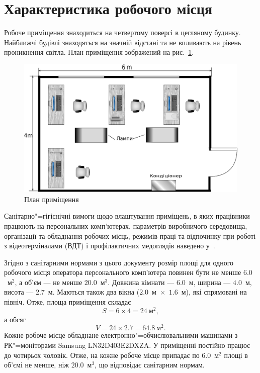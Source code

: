 \documentclass{diploma}
\begin{document}
  \section{Характеристика робочого місця}
    Робоче приміщення знаходиться на четвертому поверсі в цегляному будинку.
    Найближчі будівлі знаходяться на значній відстані та не впливають на
    рівень проникнення світла.
    План приміщення зображений на рис.~\ref{fig:plan}.
    \begin{figure}[ht]
      \centering
      \includegraphics[width=\linewidth]{plan2.eps}
      \caption{План приміщення}
      \label{fig:plan}
    \end{figure}

    Санітарно"=гігієнічні вимоги щодо влаштування приміщень, в яких працівники
    працюють на персональних комп’ютерах, параметрів виробничого середовища,
    організації та обладнання робочих місць, режимів праці та відпочинку при
    роботі з відеотерміналами (ВДТ) і профілактичних медоглядів наведено
    у~\cite{npaop128}.

    Згідно з санітарними нормами з цього документу розмір площі для одного
    робочого місця оператора персонального комп’ютера повинен бути не менше
    $6.0$~м$^2$, а об’єм --- не менше $20.0$~м$^3$.
    Довжина кімнати --- $6.0$~м, ширина --- $4.0$~м, висота ---
    $2.7$~м.
    Маються також два вікна ($2.0$~м~$\times$~$1.6$~м), які спрямовані
    на північ.
    Отже, площа приміщення складає
      \[
        S = 6 \times 4 = 24~\text{м}^2,
      \]
    а обсяг
      \[
        V = 24 \times 2.7 = 64.8~\text{м}^2.
      \]
    Кожне робоче місце обладнане електронно"=обчислювальними машинами з
    РК"=моніторами Samsung LN32D403E2DXZA.
    У приміщенні постійно працює до чотирьох чоловік.
    Отже, на кожне робоче місце припадає по $6.0$~м$^2$ площі в об’ємі не
    менше, ніж $20.0$~м$^3$, що відповідає санітарним нормам.
\end{document}

